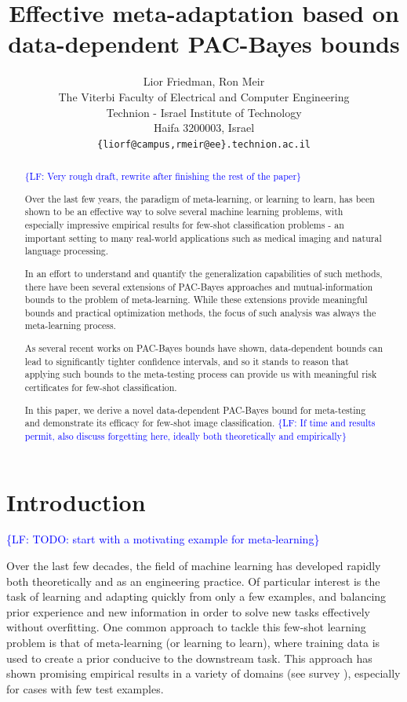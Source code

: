 \documentclass{article}
\title{Effective meta-adaptation based on data-dependent PAC-Bayes bounds}
\author{%
	Lior Friedman, Ron Meir \\
	The Viterbi Faculty of Electrical and Computer Engineering\\
	Technion - Israel Institute of Technology\\
	Haifa 3200003, Israel\\
	\texttt{\{liorf@campus,rmeir@ee\}.technion.ac.il} \\
}
\theoremstyle{definition}
\newcommand{\LF}[1]{\textcolor{blue}{\{LF: #1\}}}
\begin{document}
	
\maketitle

	\begin{abstract}
	\LF{Very rough draft, rewrite after finishing the rest of the paper}
	
	Over the last few years, the paradigm of meta-learning, or learning to learn, has been shown to be an effective way to solve several machine learning problems, with especially impressive empirical results for few-shot classification problems - an important setting to many real-world applications such as medical imaging and natural language processing.
		
	In an effort to understand and quantify the generalization capabilities of such methods, there have been several extensions of PAC-Bayes approaches and mutual-information bounds to the problem of meta-learning. While these extensions provide meaningful bounds and practical optimization methods, the focus of such analysis was always the meta-learning process. 
	
	As several recent works on PAC-Bayes bounds have shown, data-dependent bounds can lead to significantly tighter confidence intervals, and so it stands to reason that applying such bounds to the meta-testing process can provide us with meaningful risk certificates for few-shot classification.
	
	In this paper, we derive a novel data-dependent PAC-Bayes bound for meta-testing and demonstrate its efficacy for few-shot image classification. \LF{If time and results permit, also discuss forgetting here, ideally both theoretically and empirically}
		
	\end{abstract}


\section{Introduction}

\LF{TODO: start with a motivating example for meta-learning}

Over the last few decades, the field of machine learning has developed rapidly both theoretically and as an engineering practice. Of particular interest is the task of learning and adapting quickly from only a few examples, and balancing prior experience and new information in order to solve new tasks effectively without overfitting.
One common approach to tackle this few-shot learning problem is that of meta-learning (or learning to learn), where training data is used to create a prior conducive to the downstream task. This approach has shown promising empirical results in a variety of domains (see survey \citep{Hospedales2021}), especially for cases with few test examples.
\end{document}
